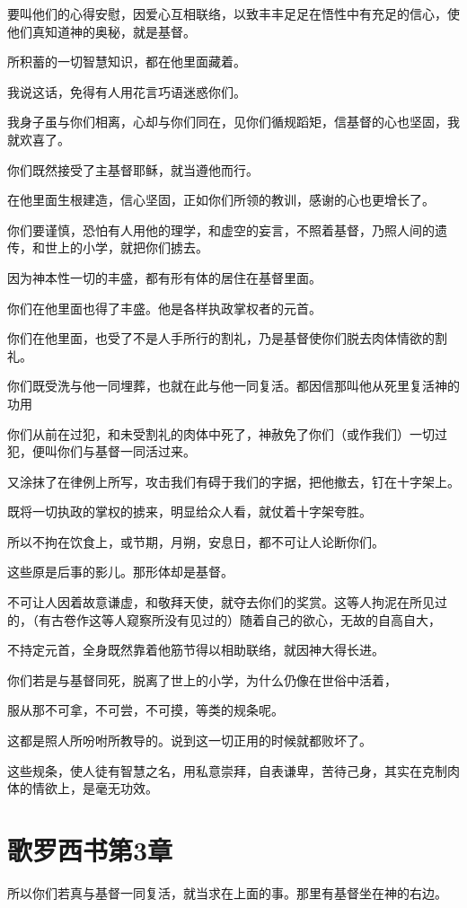 \documentclass[12pt,oneside]{book}
\begin{document}
要叫他们的心得安慰，因爱心互相联络，以致丰丰足足在悟性中有充足的信心，使他们真知道神的奥秘，就是基督。

所积蓄的一切智慧知识，都在他里面藏着。

我说这话，免得有人用花言巧语迷惑你们。

我身子虽与你们相离，心却与你们同在，见你们循规蹈矩，信基督的心也坚固，我就欢喜了。

你们既然接受了主基督耶稣，就当遵他而行。

在他里面生根建造，信心坚固，正如你们所领的教训，感谢的心也更增长了。

你们要谨慎，恐怕有人用他的理学，和虚空的妄言，不照着基督，乃照人间的遗传，和世上的小学，就把你们掳去。

因为神本性一切的丰盛，都有形有体的居住在基督里面。

你们在他里面也得了丰盛。他是各样执政掌权者的元首。

你们在他里面，也受了不是人手所行的割礼，乃是基督使你们脱去肉体情欲的割礼。

你们既受洗与他一同埋葬，也就在此与他一同复活。都因信那叫他从死里复活神的功用

你们从前在过犯，和未受割礼的肉体中死了，神赦免了你们（或作我们）一切过犯，便叫你们与基督一同活过来。

又涂抹了在律例上所写，攻击我们有碍于我们的字据，把他撤去，钉在十字架上。

既将一切执政的掌权的掳来，明显给众人看，就仗着十字架夸胜。

所以不拘在饮食上，或节期，月朔，安息日，都不可让人论断你们。

这些原是后事的影儿。那形体却是基督。

不可让人因着故意谦虚，和敬拜天使，就夺去你们的奖赏。这等人拘泥在所见过的，（有古卷作这等人窥察所没有见过的）随着自己的欲心，无故的自高自大，

不持定元首，全身既然靠着他筋节得以相助联络，就因神大得长进。

你们若是与基督同死，脱离了世上的小学，为什么仍像在世俗中活着，

服从那不可拿，不可尝，不可摸，等类的规条呢。

这都是照人所吩咐所教导的。说到这一切正用的时候就都败坏了。

这些规条，使人徒有智慧之名，用私意崇拜，自表谦卑，苦待己身，其实在克制肉体的情欲上，是毫无功效。

\chapter{歌罗西书第3章}
所以你们若真与基督一同复活，就当求在上面的事。那里有基督坐在神的右边。
\end{document}
